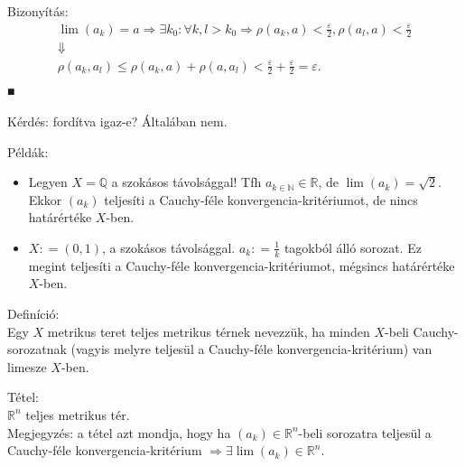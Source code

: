 \documentclass[12pt,a4paper]{scrartcl}
\providecommand{\tightlist}{%
  \setlength{\itemsep}{0pt}\setlength{\parskip}{0pt}}
\newenvironment{definicio}{}{}
\newenvironment{tetel}{}{}
\newenvironment{bizonyitas}{}{}
\newenvironment{pelda}{}{}
\begin{document}
\begin{bizonyitas}

Bizonyítás: \[\begin{matrix}
\left. \lim\left( a_{k} \right) = a\Rightarrow\exists k_{0}:\forall k,l > k_{0}\Rightarrow\rho\left( {a_{k},a} \right) < \frac{\varepsilon}{2},\rho\left( {a_{l},a} \right) < \frac{\varepsilon}{2} \right. \\
 \Downarrow \\
{\rho\left( {a_{k},a_{l}} \right) \leq \rho\left( {a_{k},a} \right) + \rho\left( {a,a_{l}} \right) < \frac{\varepsilon}{2} + \frac{\varepsilon}{2} = \varepsilon.} \\
\end{matrix}\] ■

\end{bizonyitas}

Kérdés: fordítva igaz-e? Általában nem.

\begin{pelda}

Példák:

\begin{itemize}
\tightlist
\item
  Legyen \(X = {\mathbb{Q}}\) a szokásos távolsággal! Tfh
  \(a_{k \in {\mathbb{N}}} \in {\mathbb{R}}\), de
  \(\lim\left( a_{k} \right) = \sqrt{2}\). Ekkor
  \(\left( a_{k} \right)\) teljesíti a Cauchy-féle
  konvergencia-kritériumot, de nincs határértéke \(X\)-ben.
\item
  \(X: = \left( 0,1 \right)\), a szokásos távolsággal.
  \(a_{k}: = \frac{1}{k}\) tagokból álló sorozat. Ez megint teljesíti a
  Cauchy-féle konvergencia-kritériumot, mégsincs határértéke \(X\)-ben.
\end{itemize}

\end{pelda}

\begin{definicio}

Definíció:\\
Egy \(X\) metrikus teret teljes metrikus térnek nevezzük, ha minden
\(X\)-beli Cauchy-sorozatnak (vagyis melyre teljesül a Cauchy-féle
konvergencia-kritérium) van limesze \(X\)-ben.

\end{definicio}

\begin{tetel}

Tétel:\\
\({\mathbb{R}}^{n}\) teljes metrikus tér.\\
Megjegyzés: a tétel azt mondja, hogy ha
\(\left( a_{k} \right) \in {\mathbb{R}}^{n}\)-beli sorozatra teljesül a
Cauchy-féle konvergencia-kritérium
\(\left. \Rightarrow\exists\lim\left( a_{k} \right) \in {\mathbb{R}}^{n} \right.\).

\end{tetel}
\end{document}
